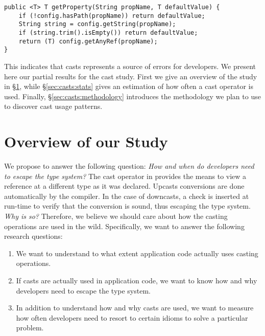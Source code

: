 \begin{lstlisting}[style=java]
public <T> T getProperty(String propName, T defaultValue) {
    if (!config.hasPath(propName)) return defaultValue;
    String string = config.getString(propName);
    if (string.trim().isEmpty()) return defaultValue;
    return (T) config.getAnyRef(propName);
}
\end{lstlisting}


This indicates that casts represents a source of errors for developers.
We present here our partial results for the cast study.
First we give an overview of the study in \S\ref{sec:casts:overview},
while \S\ref{sec:casts:stats} gives an estimation of how often a cast operator is used.
Finally, \S\ref{sec:casts:methodology} introduces the methodology we plan to use to discover cast usage patterns.

\section{Overview of our Study}
\label{sec:casts:overview}

We propose to answer the following question:
\emph{How and when do developers need to escape the type system?}
The cast operator in \java{} provides the means to view a reference at a different type as it was declared.
Upcasts conversions are done automatically by the compiler.
In the case of downcasts, a check is inserted at run-time to verify that the conversion is sound, thus escaping the type system.
\emph{Why is so?}
Therefore, we believe we should care about how the casting operations are used in the wild.
Specifically, we want to answer the following research questions:

\begin{enumerate}[label=$CRQ\arabic*:$,ref=$CRQ\arabic*$,leftmargin=3.4\parindent]
\item\label{enum:rq1}{\bf \crqA}
We want to understand to what extent application code actually uses casting operations.
\item\label{enum:rq2}{\bf \crqB}
If casts are actually used in application code, we want to know how and why developers need to escape the type system.
\item\label{enum:rq3}{\bf \crqC}
In addition to understand how and why casts are used, we want to measure how often developers need to resort to certain idioms to solve a particular problem.
\end{enumerate}

